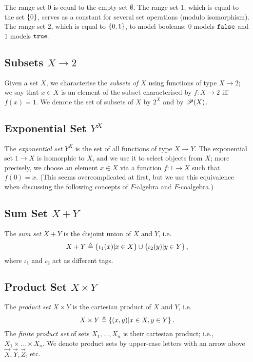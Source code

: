 The range set 0 is equal to the empty set $\emptyset$. 
The range set 1, which is equal to the set $\left\{0\right\}$, serves as a constant for several set operations (modulo isomorphism).
The range set 2, which is equal to $\left\{0,1\right\}$, to model booleans: 0 models $\mathtt{\texttt{false}}$ and $1$ models $\mathtt{\texttt{true}}$. 

\subsection{Subsets \texorpdfstring{$X\rightarrow 2$}{X -> 2}}
Given a set $X$, we characterise the \emph{subsets of $X$} using functions of type $X\rightarrow 2$; we say that $x\in X$ is an element of the subset characterised by $f\colon X\rightarrow 2$ iff $f(x)=1$. We denote the set of subsets of $X$ by $2^X$ and by ${{\mathscr{P}}\!\left({X}\right)}$.
 
\subsection{Exponential Set \texorpdfstring{$Y^X$}{Y\^X}}
The \emph{exponential set} $Y^X$ is the set of all functions of type $X\rightarrow Y$. 
The exponential set $1\rightarrow X$ is isomorphic to $X$, and we use it to select objects from $X$; more precisely, we choose an element $x\in X$ via a function $f\colon 1\rightarrow X$ such that $f(0)=x$. (This seems overcomplicated at first, but we use this equivalence when discussing the following concepts of $F$-algebra and $F$-coalgebra.)

\subsection{Sum Set \texorpdfstring{$X+Y$}{X+Y}}
The \emph{sum set} $X + Y$ is the disjoint union of $X$ and $Y$, i.e. 
\begin{align*}
    X + Y\triangleq\left\{ \iota_1(x) |x\in X\right\} \cup \left\{\iota_2(y) | y\in Y\right\},
\end{align*}
where $\iota_1$ and $\iota_2$ act as different tags.
\subsection{Product Set \texorpdfstring{$X\times Y$}{XxY}}
The \emph{product set} $X\times Y$ is the cartesian product of $X$ and $Y$, i.e. 
\begin{align*}
    X\times Y\triangleq\left\{(x,y)|x\in X, y\in Y\right\}.
\end{align*}
The \emph{finite product set} of sets $X_1, \ldots, X_n$ is their cartesian product; i.e., $X_1\times \ldots \times X_n$. We denote product sets by upper-case letters with an arrow above $\vec{X},\vec{Y}, \vec{Z}$, etc.
